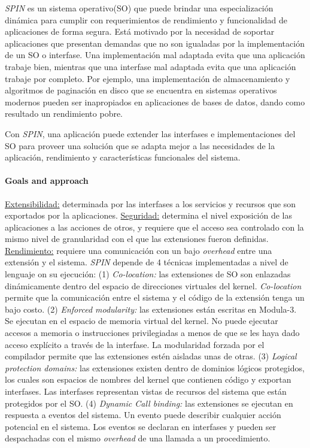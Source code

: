 \textit{SPIN} es un sistema operativo(SO) que puede brindar una especialización dinámica para cumplir con requerimientos de rendimiento y funcionalidad de aplicaciones de forma segura. Está motivado por la necesidad de soportar aplicaciones que presentan demandas que no son igualadas por la implementación de un SO o interfase. Una implementación mal adaptada evita que una aplicación trabaje bien, mientras que una interfase mal adaptada evita que una aplicación trabaje por completo. Por ejemplo, una implementación de almacenamiento y algoritmos de paginación en disco que se encuentra en sistemas operativos modernos pueden ser inapropiados en aplicaciones de bases de datos, dando como resultado un rendimiento pobre.

Con \textit{SPIN}, una aplicación puede extender las interfases e implementaciones del SO para proveer una solución que se adapta mejor a las necesidades de la aplicación, rendimiento y características funcionales del sistema.

\paragraph{\textnormal{\textbf{Goals and approach}}}
\underline{Extensibilidad:} determinada por las interfases a los servicios y recursos que son exportados por la aplicaciones. \underline{Seguridad:} determina el nivel exposición de las aplicaciones a las acciones de otros, y requiere que el acceso sea controlado con la mismo nivel de granularidad con el que las extensiones fueron definidas. \underline{Rendimiento:} requiere una comunicación con un bajo \textit{overhead} entre una extensión y el sistema. \textit{SPIN} depende de 4 técnicas implementadas a nivel de lenguaje on su ejecución: (1) \textit{Co-location:} las extensiones de SO son enlazadas dinámicamente dentro del espacio de direcciones virtuales del kernel. \textit{Co-location} permite que la comunicación entre el sistema y el código de la extensión tenga un bajo costo. (2) \textit{Enforced modularity:} las extensiones están escritas en Modula-3. Se ejecutan en el espacio de memoria virtual del kernel. No puede ejecutar accesos a memoria o instrucciones privilegiadas a menos de que se les haya dado acceso explícito a través de la interfase. La modularidad forzada por el compilador permite que las extensiones estén aisladas unas de otras. (3) \textit{Logical protection domains:} las extensiones existen dentro de dominios lógicos protegidos, los cuales son espacios de nombres del kernel que contienen código y exportan interfases. Las interfases representan vistas de recursos del sistema que están protegidos por el SO. (4) \textit{Dynamic Call binding:} las extensiones se ejecutan en respuesta a eventos del sistema. Un evento puede describir cualquier acción potencial en el sistema. Los eventos se declaran en interfases y pueden ser despachadas con el mismo \textit{overhead} de una llamada a un procedimiento.

